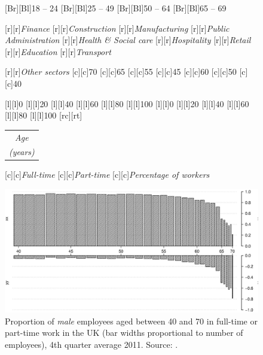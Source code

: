 \documentclass[11 pt, a4paper]{report}
\renewcommand{\arraystretch}{1.2}
\begin{document}
\begin{figure}[hbtp!]
[Br][Bl]{\small{18 -- 24}}
[Br][Bl]{\small{25 -- 49}}
[Br][Bl]{\small{50 -- 64}}
[Br][Bl]{\small{65 -- 69}}


[r][r]{\small{\emph{Finance}}}
[r][r]{\small{\emph{Construction}}}
[r][r]{\small{\emph{Manufacturing}}}
[r][r]{\small{\emph{Public Administration}}}
[r][r]{\small{\emph{Health \& Social care}}}
[r][r]{\small{\emph{Hospitality}}}
[r][r]{\small{\emph{Retail}}}
[r][r]{\small{\emph{Education}}}
[r][r]{\small{\emph{Transport}}}

[r][r]{\small{\emph{Other sectors}}}
[c][c]{\small{70}}
[c][c]{\small{65}}
[c][c]{\small{55}}
[c][c]{\small{45}}
[c][c]{\small{60}}
[c][c]{\small{50}}
[c][c]{\small{40}}

[l][l]{\small{0}}
[l][l]{\small{20}}
[l][l]{\small{40}}
[l][l]{\small{60}}
[l][l]{\small{80}}
[l][l]{\small{100}}
[l][l]{\small{0}}
[l][l]{\small{20}}
[l][l]{\small{40}}
[l][l]{\small{60}}
[l][l]{\small{80}}
[l][l]{\small{100}}
[rc][rt]{\small{
\renewcommand{\arraystretch}{0.8}
\begin{tabular}{@{}c}
\emph{Age}\\
\emph{(years)}
\end{tabular}}}

[c][c]{\small{\emph{Full-time}}}
[c][c]{\small{\emph{Part-time}}}
[c][c]{\small{\emph{Percentage of workers}}}

\includegraphics[width=\textwidth]{../figures/Fig5.2.eps}
\caption{Proportion of \emph{male} employees aged between 40 and 70 in full-time or part-time work in the UK (bar widths proportional to number of employees), 4th quarter average 2011. Source: \citet{DWP2013}.}\label{Fig:53}
\end{figure}
\end{document}
